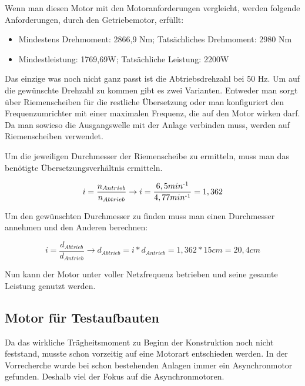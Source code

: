 Wenn man diesen Motor mit den Motoranforderungen vergleicht, werden folgende Anforderungen, durch den Getriebemotor, erfüllt:

\begin{itemize}
	\item{Mindestens Drehmoment: 2866,9 Nm; Tatsächliches Drehmoment: 2980 Nm}
	\item{Mindestleistung: 1769,69W; Tatsächliche Leistung: 2200W}
\end{itemize}

Das einzige was noch nicht ganz passt ist die Abtriebsdrehzahl bei 50 Hz. Um auf die gewünschte Drehzahl zu kommen gibt es zwei Varianten. Entweder man sorgt über Riemenscheiben für die restliche Übersetzung oder man konfiguriert den Frequenzumrichter mit einer maximalen Frequenz, die auf den Motor wirken darf. \\

Da man sowieso die Ausgangswelle mit der Anlage verbinden muss, werden auf Riemenscheiben verwendet.

Um die jeweiligen Durchmesser der Riemenscheibe zu ermitteln, muss man das benötigte Übersetzungsverhältnis ermitteln.

\begin{center}
\begin{equation}
  \label{eq:5}
	i=  \frac{n_{Antrieb}}{n_{Abtrieb}} \rightarrow i = \frac{6,5 min\textsuperscript{-1}}{4,77 min\textsuperscript{-1}} = 1,362
\end{equation} 
\end{center}

Um den gewünschten Durchmesser zu finden muss man einen Durchmesser annehmen und den Anderen berechnen:

\begin{center}
\begin{equation}
  \label{eq:6}
	i=  \frac{d_{Abtrieb}}{d_{Antrieb}} \rightarrow d_{Abtrieb} = i * d_{Antrieb} =  1,362 * 15 cm = 20,4cm
\end{equation} 
\end{center}

Nun kann der Motor unter voller Netzfrequenz betrieben und seine gesamte Leistung genutzt werden. 

\subsection{Motor für Testaufbauten}
\label{sec:motorFuerTestaufbauten}

Da das wirkliche Trägheitsmoment zu Beginn der Konstruktion noch nicht feststand, musste schon vorzeitig auf eine Motorart entschieden werden. In der Vorrecherche wurde bei schon bestehenden Anlagen immer ein Asynchronmotor gefunden. Deshalb viel der Fokus auf die Asynchronmotoren.
\newpage
